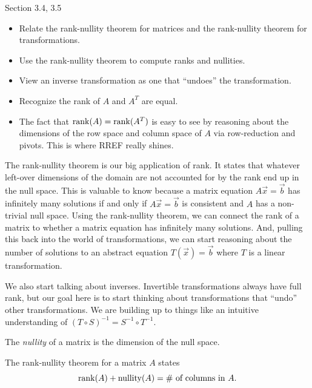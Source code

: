 \begin{lesson}

	Section 3.4, 3.5

	\begin{itemize}
		\item Relate the rank-nullity theorem for matrices and the rank-nullity theorem for transformations.
		\item Use the rank-nullity theorem to compute ranks and nullities.
		\item View an inverse transformation as one that ``undoes'' the transformation.
		\item Recognize the rank of $A$ and $A^T$ are equal.
	\end{itemize}

	\begin{annotation}
		\begin{notes}
			\begin{itemize}
				\item The fact that $\operatorname{rank}(A)=\operatorname{rank}(A^T)$ is easy to see by reasoning
					about the dimensions of the row space and column space of $A$
					via row-reduction and pivots. This is where RREF really shines.
			\end{itemize}
		\end{notes}
	\end{annotation}
	The rank-nullity theorem is our big application of rank. It states that whatever
	left-over dimensions of the domain are not accounted for by the rank end up in the null space.
	This is valuable to know because a matrix equation $A\vec x=\vec b$ has infinitely many
	solutions if and only if $A\vec x=\vec b$ is consistent and $A$ has a non-trivial null space. Using
	the rank-nullity theorem, we can connect the rank of a matrix to whether a matrix equation has infinitely
	many solutions. And, pulling this back into the world of transformations, we can start reasoning
	about the number of solutions to an abstract equation $T(\vec x)=\vec b$ where $T$ is a linear
	transformation.

	We also start talking about inverses. Invertible transformations always have full rank, but
	our goal here is to start thinking about transformations that ``undo'' other transformations. We
	are building up to things like an intuitive understanding of $(T\circ S)^{-1} = S^{-1}\circ T^{-1}$.

\end{lesson}
	\bookonlynewpage
	\begin{theorem}
	The \emph{nullity} of a matrix is the dimension of the null space.

	The rank-nullity theorem for a matrix $A$ states
	\[
		\operatorname{rank}(A)+\operatorname{nullity}(A) = \#\text{ of columns in }A.
	\]
	\end{theorem}

